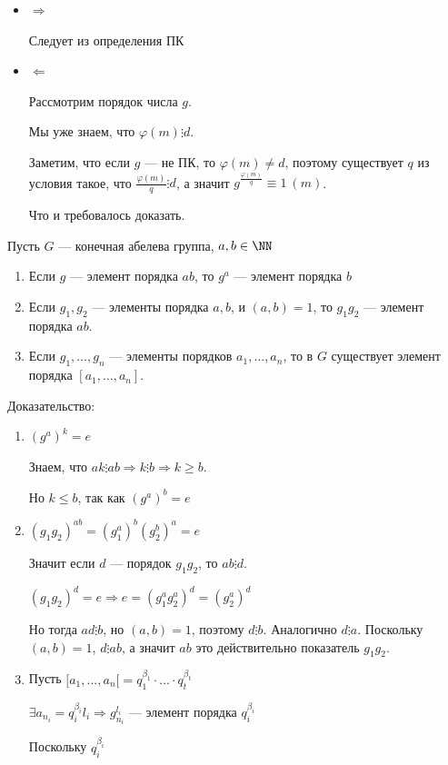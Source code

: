 \begin{itemize}
    \item
        \( \Rightarrow \)

        Следует из определения ПК
    \item
        \( \Leftarrow \)

        Рассмотрим порядок числа \( g \).

        Мы уже знаем, что \( \varphi(m) \vdots d \).

        Заметим, что если \( g \) --- не ПК, то \( \varphi(m) \neq d \),
        поэтому существует \( q \) из условия такое, что \( \frac{\varphi(m)}{q} \vdots d \),
        а значит \( g^{\frac{\varphi(m)}{q}} \equiv 1 \: (m) \).

        Что и требовалось доказать.
\end{itemize}

\begin{lemma}{}{}
    Пусть \( G \) --- конечная абелева группа, \( a, b \in \NN \)

    \begin{enumerate}
        \item
            Если \( g \) --- элемент порядка \( ab \), то \( g^a \) --- элемент порядка \( b \)
        \item
            Если \( g_1, g_2 \) --- элементы порядка \( a, b \), и \( (a, b) = 1 \),
            то \( g_1 g_2 \) --- элемент порядка \( ab \).
        \item
            Если \( g_1, \ldots, g_n \) --- элементы порядков \( a_1, \ldots, a_n \),
            то в \( G \) существует элемент порядка \( [a_1, \ldots, a_n] \).
    \end{enumerate}
\end{lemma}

Доказательство:
\begin{enumerate}
    \item
        \( (g^a)^k = e \)

        Знаем, что \( ak \vdots ab \Rightarrow k \vdots b \Rightarrow k \geq b \).

        Но \( k \leq b \), так как \( (g^a)^b = e \)
    \item
        \( (g_1 g_2)^{ab} = (g_1^a)^b (g_2^b)^a = e \)

        Значит если \( d \) --- порядок \( g_1 g_2 \), то \( ab \vdots d \).

        \( (g_1 g_2)^d = e \Rightarrow e = (g_1^a g_2^a)^d = (g_2^a)^d \)

        Но тогда \( ad \vdots b \), но \( (a, b) = 1 \), поэтому \( d \vdots b \).
        Аналогично \( d \vdots a \). Поскольку \( (a, b) = 1 \), \( d \vdots ab \),
        а значит \( ab \) это действительно показатель \( g_1 g_2 \).
    \item
        Пусть \( [a_1, \ldots, a_n[ = q_1^{\beta_1} \cdot \ldots \cdot q_t^{\beta_t} \)

        \( \exists a_{n_i} = q_i^{\beta_i} l_i \Rightarrow g_{n_i}^{l_i} \) --- элемент порядка \( q_i^{\beta_i} \)

        Поскольку \( q_i^{\beta_i} \) 
\end{enumerate}

